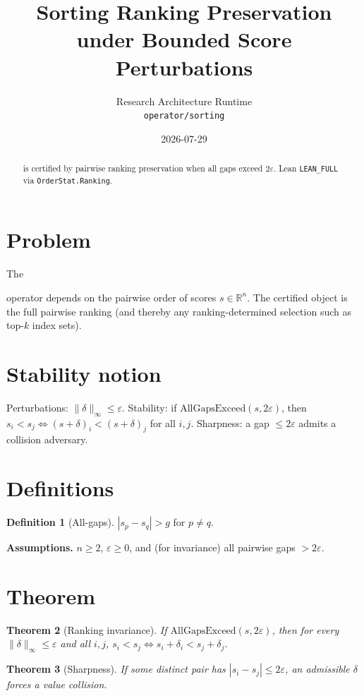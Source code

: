 \documentclass[12pt]{article}
\title{Sorting Ranking Preservation under Bounded Score Perturbations}
\author{Research Architecture Runtime\\[0.25em]
{\normalsize\texttt{operator/sorting}}}
\date{2026-07-29}
\theoremstyle{plain}
\newtheorem{theorem}{Theorem}
\theoremstyle{definition}
\newtheorem{definition}[theorem]{Definition}
\theoremstyle{remark}
\newcommand{\leanpath}[1]{%
  {\raggedright\urlstyle{tt}\path{#1}}}
\begin{document}
\maketitle

\begin{abstract}
\leanpath{sorting} is certified by pairwise ranking preservation when all gaps exceed $2\varepsilon$. Lean \texttt{LEAN\_FULL} via \texttt{OrderStat.Ranking}.
\end{abstract}

\noindent
\begin{center}
\end{center}
\vspace{0.6em}

\section{Problem}
{\raggedright\sloppy
The \leanpath{sorting} operator depends on the pairwise order of scores $s\in\mathbb{R}^n$. The certified object is the full pairwise ranking (and thereby any ranking-determined selection such as top-$k$ index sets).
\par}

\section{Stability notion}
Perturbations: $\|\delta\|_\infty\le\varepsilon$. Stability: if $\mathrm{AllGapsExceed}(s,2\varepsilon)$, then $s_i<s_j\Leftrightarrow (s+\delta)_i<(s+\delta)_j$ for all $i,j$. Sharpness: a gap $\le 2\varepsilon$ admits a collision adversary.

\section{Definitions}
\begin{definition}[All-gaps]
$|s_p-s_q|>g$ for $p\neq q$.\end{definition}
\noindent\textbf{Assumptions.} $n\ge 2$, $\varepsilon\ge 0$, and (for invariance) all pairwise gaps $>2\varepsilon$.

\section{Theorem}
\begin{theorem}[Ranking invariance]\label{thm:inv}
If $\mathrm{AllGapsExceed}(s,2\varepsilon)$, then for every $\|\delta\|_\infty\le\varepsilon$ and all $i,j$, $s_i<s_j\Leftrightarrow s_i+\delta_i<s_j+\delta_j$.
\end{theorem}
\begin{theorem}[Sharpness]\label{thm:sharp}
If some distinct pair has $|s_i-s_j|\le 2\varepsilon$, an admissible $\delta$ forces a value collision.
\end{theorem}
\end{document}
